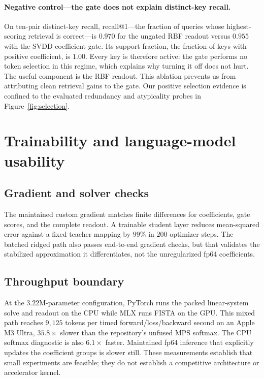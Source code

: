 \paragraph{\textbf{Negative control---the gate does not explain distinct-key
recall.}}
On ten-pair distinct-key recall, recall@1---the fraction of queries whose
highest-scoring retrieval is correct---is \(0.970\) for the ungated RBF readout
versus \(0.955\) with the SVDD coefficient gate. Its support fraction, the
fraction of keys with positive coefficient, is \(1.00\). Every key is therefore
active: the gate performs no token selection in this regime, which explains why
turning it off does not hurt. The useful component is the RBF readout. This
ablation prevents us from attributing clean retrieval gains to the gate. Our
positive selection evidence is confined to the evaluated redundancy and
atypicality probes in Figure~\ref{fig:selection}.

\section{Trainability and language-model usability}\label{sec:trainable}

\subsection{Gradient and solver checks}\label{sec:grad}

The maintained custom gradient matches finite differences for coefficients,
gate scores, and the complete readout. A trainable student layer reduces mean-squared error against a
fixed teacher mapping by \(99\%\) in \(200\) optimizer steps. The batched ridged
path also passes end-to-end gradient checks, but that validates the stabilized
approximation it differentiates, not the unregularized fp64 coefficients.

\subsection{Throughput boundary}\label{sec:throughput}

At the \(3.22\)M-parameter configuration, PyTorch runs the packed linear-system
solve and readout on the CPU while MLX runs FISTA on the GPU. This mixed path
reaches \(9{,}125\) tokens per timed
forward/loss/backward second on an Apple M3 Ultra, \(35.8\times\) slower than
the repository's unfused MPS softmax. The CPU softmax diagnostic is also
\(6.1\times\) faster. Maintained fp64 inference that explicitly updates the
coefficient groups is slower still.
These measurements establish that small experiments are feasible; they do not
establish a competitive architecture or accelerator kernel.


